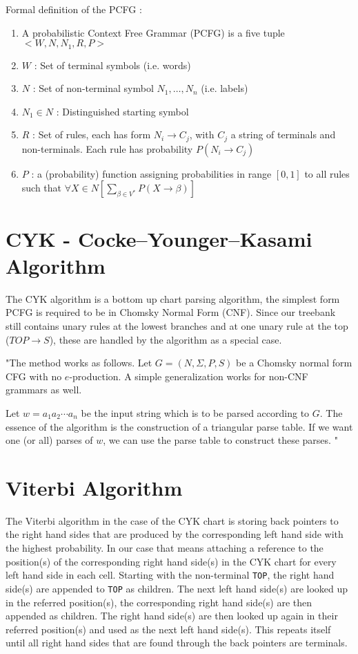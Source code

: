 \documentclass[11pt,twocolumn]{article}
\begin{document}
Formal definition of the PCFG \cite{slides2}:
\begin{enumerate}
\item A probabilistic Context Free Grammar (PCFG) is a five tuple $< W, N, N_1, R, P >$
\item $W$ : Set of terminal symbols (i.e. words)
\item $N$ : Set of non-terminal symbol $N_1, \ldots , N_n$ (i.e. labels)
\item $N_1 \in N$ : Distinguished starting symbol
\item $R$ : Set of rules, each has form $N_i \rightarrow C_j$, with $C_j$ a string of terminals and non-terminals. Each rule has probability $P (N_i \rightarrow C_j )$
\item $P$ : a (probability) function assigning probabilities in range $[0, 1]$ to all rules such that $\forall X \in N \left[ \sum_{\beta \in V^*} P (X \rightarrow \beta) \right]$
\end{enumerate}

\section{CYK - Cocke–Younger–Kasami Algorithm}
The CYK algorithm is a bottom up chart parsing algorithm, the simplest form PCFG is required to be in Chomsky Normal Form (CNF). Since our treebank still contains unary rules at the lowest branches and at one unary rule at the top ($TOP \rightarrow S$), these are handled by the algorithm as a special case.

"The method works as follows. Let $G = (N, \Sigma , P, S)$ be a Chomsky normal form CFG with no $e$-production. A simple generalization works for non-CNF grammars as well. 

Let $w = a_1 a_2 \cdots a_n$ be the input string which is to be parsed according to $G$. The essence of the algorithm is the construction of a triangular parse table. If we want one (or all) parses of $w$, we can use the parse table to construct these parses. \cite{cyk}"




\section{Viterbi Algorithm}
The Viterbi algorithm in the case of the CYK chart is storing back pointers to the right hand sides that are produced by the corresponding left hand side with the highest probability. In our case that means attaching a reference to the position(s) of the corresponding right hand side(s) in the CYK chart for every left hand side in each cell. Starting with the non-terminal \texttt{TOP}, the right hand side(s) are appended to \texttt{TOP} as children. The next left hand side(s) are looked up in the referred position(s), the corresponding right hand side(s) are then appended as children. The right hand side(s) are then looked up again in their referred position(s) and used as the next left hand side(s). This repeats itself until all right hand sides that are found through the back pointers are terminals.
\end{document}
